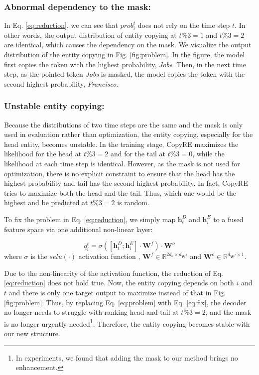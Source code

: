 \documentclass[letterpaper]{article} \usepackage{aaai20}  \usepackage{times}  \usepackage{helvet} \usepackage{courier}  \usepackage[hyphens]{url}  \usepackage{graphicx}
\begin{document}
      \subsubsection{Abnormal dependency to the mask:}In Eq. \eqref{eq:reduction}, we can see that $prob^t_i$ does not rely on the time step $t$. 
      In other words, the output distribution of entity copying at $t\%3=1$ and $t\%3=2$ are identical, which causes the dependency on the mask. 
      We visualize the output distribution of the entity copying in Fig. \ref{fig:problem}. 
      In the figure, the model first copies the token with the highest probability, \textit{Jobs}. 
      Then, in the next time step, as the pointed token \textit{Jobs} is masked, the model copies the token with the second highest probability, \textit{Francisco}.
      
      \subsubsection{Unstable entity copying:}Because the distributions of two time steps are the same and the mask is only used in evaluation rather than optimization, 
the entity copying, especially for the head entity, becomes unstable. In the training stage, CopyRE maximizes the likelihood for the head at $t\%3=2$ and for the tail at $t\%3=0$, while the likelihood at each time step is identical. However, as the mask is not used for optimization, there is no explicit constraint to ensure that the head has the highest probability and tail has the second highest probability. In fact, CopyRE tries to maximize both the head and the tail. Thus, which one would be the highest and be predicted at $t\%3=2$ is random.


  
  To fix the problem in Eq. \eqref{eq:reduction}, we simply map $\bm{h}^D_t$ and $\bm{h}^E_i$ to a fused feature space via one additional non-linear layer:
  
  \begin{equation}
      q^t_{i} = \sigma([\bm{h}_t^D;\bm{h}_i^E] \cdot \bm{W}^f) \cdot \bm{W}^o 
      \label{eq:fix}
  \end{equation}
  where $\sigma$ is the $selu(\cdot)$ activation function \cite{selu}, $\bm{W}^f \in \mathbb{R}^{2d_o \times d_{\bm{W}^f}}$ and $\bm{W}^o \in \mathbb{R}^{d_{\bm{W}^f} \times 1}$. 
  
  Due to the non-linearity of the activation function, the reduction of Eq. \eqref{eq:reduction} does not hold true. 
  Now, the entity copying depends on both $i$ and $t$ and there is only one target output to maximize instead of that in Fig. \ref{fig:problem}. 
  Thus, by replacing Eq. \eqref{eq:problem} with Eq. \eqref{eq:fix}, the decoder no longer needs to struggle with ranking head and tail at $t\%3=2$, and the mask is no longer urgently needed\footnote{In experiments, we found that adding the mask to our method brings no enhancement.}. 
  Therefore, the entity copying becomes stable with our new structure. 
\end{document}
